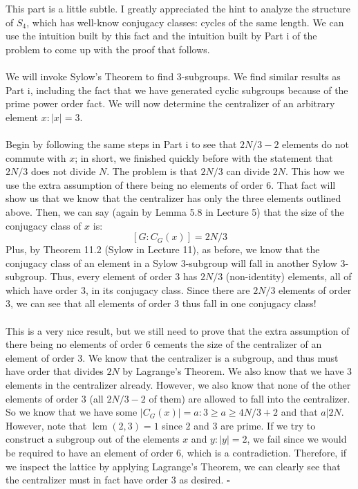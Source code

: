 \documentclass[letterpaper]{article}
\newcommand*{\QED}{\hfill\ensuremath{\square}}%
\DeclareMathOperator{\lcm}{lcm}
\begin{document}
This part is a little subtle.
I greatly appreciated the hint to analyze the structure of $ S_4 $, which has well-know conjugacy classes: cycles of the same length.
We can use the intuition built by this fact and the intuition built by Part i of the problem to come up with the proof that follows.
\\ \\
We will invoke Sylow's Theorem to find $ 3 $-subgroups.
We find similar results as Part i, including the fact that we have generated cyclic subgroups because of the prime power order fact.
We will now determine the centralizer of an arbitrary element $ x : |x| = 3 $.
\\ \\
Begin by following the same steps in Part i to see that $ 2N/3 - 2 $ elements do not commute with $ x $; in short, we finished quickly before with the statement that $ 2N/3 $ does not divide $ N $.
The problem is that $ 2N/3 $ can divide $ 2N $.
This how we use the extra assumption of there being no elements of order $ 6 $.
That fact will show us that we know that the centralizer has only the three elements outlined above.
Then, we can say (again by Lemma 5.8 in Lecture 5) that the size of the conjugacy class of $ x $ is:
\[
\left[G : C_G(x) \right] = 2N / 3
\]
Plus, by Theorem 11.2 (Sylow in Lecture 11), as before, we know that the conjugacy class of an element in a Sylow $ 3 $-subgroup will fall in another Sylow $ 3 $-subgroup.
Thus, every element of order $ 3 $ has $ 2N/3 $ (non-identity) elements, all of which have order $ 3 $, in its conjugacy class.
Since there are $ 2N/3 $ elements of order $ 3 $, we can see that all elements of order $ 3 $ thus fall in one conjugacy class!
\\ \\
This is a very nice result, but we still need to prove that the extra assumption of there being no elements of order $ 6 $ cements the size of the centralizer of an element of order $ 3 $.
We know that the centralizer is a subgroup, and thus must have order that divides $ 2N $ by Lagrange's Theorem.
We also know that we have $ 3 $ elements in the centralizer already.
However, we also know that none of the other elements of order $ 3 $ (all $ 2N/3 - 2 $ of them) are allowed to fall into the centralizer.
So we know that we have some $ |C_G(x)| = a : 3 \geq a \geq 4N / 3 + 2 $ and that $ a | 2N $.
However, note that $ \lcm{(2, 3)} = 1 $ since $ 2 $ and $ 3 $ are prime.
If we try to construct a subgroup out of the elements $ x $ and $ y : |y| = 2 $, we fail since we would be required to have an element of order $ 6 $, which is a contradiction.
Therefore, if we inspect the lattice by applying Lagrange's Theorem, we can clearly see that the centralizer must in fact have order $ 3 $ as desired.
\QED{}
\end{document}
